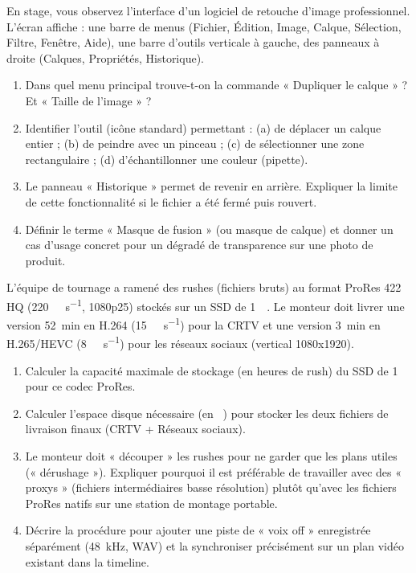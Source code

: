 \documentclass[11pt]{article}
\begin{document}
\begin{exercice}
En stage, vous observez l'interface d'un logiciel de retouche d'image professionnel. L'écran affiche : une barre de menus (Fichier, Édition, Image, Calque, Sélection, Filtre, Fenêtre, Aide), une barre d'outils verticale à gauche, des panneaux à droite (Calques, Propriétés, Historique).
\begin{enumerate}
    \item Dans quel menu principal trouve-t-on la commande « Dupliquer le calque » ? Et « Taille de l'image » ?
    \item Identifier l'outil (icône standard) permettant : (a) de déplacer un calque entier ; (b) de peindre avec un pinceau ; (c) de sélectionner une zone rectangulaire ; (d) d'échantillonner une couleur (pipette).
    \item Le panneau « Historique » permet de revenir en arrière. Expliquer la limite de cette fonctionnalité si le fichier a été fermé puis rouvert.
    \item Définir le terme « Masque de fusion » (ou masque de calque) et donner un cas d'usage concret pour un dégradé de transparence sur une photo de produit.
\end{enumerate}
\end{exercice}

\begin{exercice}
L'équipe de tournage a ramené des rushes (fichiers bruts) au format ProRes 422 HQ (\SI{220}{\mega\bit\per\second}, 1080p25) stockés sur un SSD de \SI{1}{\tera\byte}. Le monteur doit livrer une version \SI{52}{\minute} en H.264 (\SI{15}{\mega\bit\per\second}) pour la CRTV et une version \SI{3}{\minute} en H.265/HEVC (\SI{8}{\mega\bit\per\second}) pour les réseaux sociaux (vertical 1080x1920).
\begin{enumerate}
    \item Calculer la capacité maximale de stockage (en heures de rush) du SSD de \SI{1}{\tera\byte} pour ce codec ProRes.
    \item Calculer l'espace disque nécessaire (en \unit{\giga\byte}) pour stocker les deux fichiers de livraison finaux (CRTV + Réseaux sociaux).
    \item Le monteur doit « découper » les rushes pour ne garder que les plans utiles (« dérushage »). Expliquer pourquoi il est préférable de travailler avec des « proxys » (fichiers intermédiaires basse résolution) plutôt qu'avec les fichiers ProRes natifs sur une station de montage portable.
    \item Décrire la procédure pour ajouter une piste de « voix off » enregistrée séparément (\SI{48}{\kilo\hertz}, WAV) et la synchroniser précisément sur un plan vidéo existant dans la timeline.
\end{enumerate}
\end{exercice}
\end{document}
